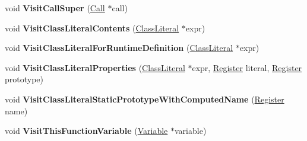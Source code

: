 \begin{DoxyCompactItemize}
\item 
void {\bfseries Visit\+Call\+Super} (\hyperlink{classv8_1_1internal_1_1_call}{Call} $\ast$call)\hypertarget{classv8_1_1internal_1_1interpreter_1_1_bytecode_generator_a4df029789a7461d31cfef49517882d33}{}\label{classv8_1_1internal_1_1interpreter_1_1_bytecode_generator_a4df029789a7461d31cfef49517882d33}

\item 
void {\bfseries Visit\+Class\+Literal\+Contents} (\hyperlink{classv8_1_1internal_1_1_class_literal}{Class\+Literal} $\ast$expr)\hypertarget{classv8_1_1internal_1_1interpreter_1_1_bytecode_generator_ac53586e30556af12e0d230fcbc7b42b9}{}\label{classv8_1_1internal_1_1interpreter_1_1_bytecode_generator_ac53586e30556af12e0d230fcbc7b42b9}

\item 
void {\bfseries Visit\+Class\+Literal\+For\+Runtime\+Definition} (\hyperlink{classv8_1_1internal_1_1_class_literal}{Class\+Literal} $\ast$expr)\hypertarget{classv8_1_1internal_1_1interpreter_1_1_bytecode_generator_a5a987ebe3660662855ae9b5aaf96a189}{}\label{classv8_1_1internal_1_1interpreter_1_1_bytecode_generator_a5a987ebe3660662855ae9b5aaf96a189}

\item 
void {\bfseries Visit\+Class\+Literal\+Properties} (\hyperlink{classv8_1_1internal_1_1_class_literal}{Class\+Literal} $\ast$expr, \hyperlink{classv8_1_1internal_1_1interpreter_1_1_register}{Register} literal, \hyperlink{classv8_1_1internal_1_1interpreter_1_1_register}{Register} prototype)\hypertarget{classv8_1_1internal_1_1interpreter_1_1_bytecode_generator_ab0d2c0a5eab03b02057bb2429a0ca5ae}{}\label{classv8_1_1internal_1_1interpreter_1_1_bytecode_generator_ab0d2c0a5eab03b02057bb2429a0ca5ae}

\item 
void {\bfseries Visit\+Class\+Literal\+Static\+Prototype\+With\+Computed\+Name} (\hyperlink{classv8_1_1internal_1_1interpreter_1_1_register}{Register} name)\hypertarget{classv8_1_1internal_1_1interpreter_1_1_bytecode_generator_a93f75a9082797c066e4d39654c7749a5}{}\label{classv8_1_1internal_1_1interpreter_1_1_bytecode_generator_a93f75a9082797c066e4d39654c7749a5}

\item 
void {\bfseries Visit\+This\+Function\+Variable} (\hyperlink{classv8_1_1internal_1_1compiler_1_1_code_assembler_1_1_variable}{Variable} $\ast$variable)\hypertarget{classv8_1_1internal_1_1interpreter_1_1_bytecode_generator_afd215299d634a3420f3d68ee45919f75}{}\label{classv8_1_1internal_1_1interpreter_1_1_bytecode_generator_afd215299d634a3420f3d68ee45919f75}


\end{DoxyCompactItemize}
